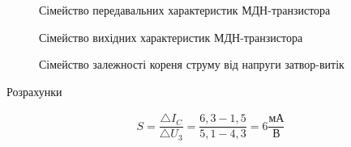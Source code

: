 \documentclass[a4paper,14pt]{extreport}
\begin{document}
\newpage
\clearpage
\begin{figure}[h]
\caption{Сімейство передавальних характеристик МДН-транзистора}
\label{ris1}
\end{figure}

\begin{figure}[h!]
\caption{Сімейство вихідних характеристик МДН-транзистора}
\label{ris1}
\end{figure}
\begin{figure}[h]
\caption{Сімейство залежності кореня струму від напруги затвор-витік}
\label{ris1}
\end{figure}
\newpage
  \begin{center}Розрахунки\end{center}
\begin{align}\label{q1}
  S = \dfrac{\triangle I_C}{\triangle U_{\text{3}}} = \dfrac{6,3-1,5}{5,1-4,3}=6 \dfrac{\text{мА}}{\text{В}}
\end{align}
\end{document}

